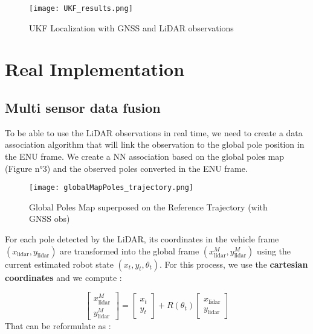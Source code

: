 \documentclass[conference]{IEEEtran}
\begin{document}
\begin{figure}[H]
    \centering
    \texttt{[image: UKF\_results.png]}
    \caption{UKF Localization with GNSS and LiDAR observations}
    \label{fig:enter-label}
\end{figure}

\vspace{3mm}

\section{Real Implementation}

\vspace{2mm}

\subsection{Multi sensor data fusion}

To be able to use the LiDAR observations in real time, we need to create a data association algorithm that will link the observation to the global pole position in the ENU frame. We create a NN association based on the global poles map (Figure n°3) and the observed poles converted in the ENU frame.   

\begin{figure}[H]
    \centering
    \texttt{[image: globalMapPoles\_trajectory.png]}
    \caption{Global Poles Map superposed on the Reference Trajectory (with GNSS obs)}
    \label{fig:enter-label}
\end{figure}

For each pole detected by the LiDAR, its coordinates in the vehicle frame \((x_{\text{lidar}}, y_{\text{lidar}})\) are transformed into the global frame \((x_{\text{lidar}}^{M}, y_{\text{lidar}}^{M})\) using the current estimated robot state \((x_t, y_t, \theta_t)\). For this process, we use the \textbf{cartesian coordinates} and we compute :

\[
\begin{bmatrix}
x_{\text{lidar}}^{M} \\
y_{\text{lidar}}^{M}
\end{bmatrix}
=
\begin{bmatrix}
x_t \\
y_t
\end{bmatrix} 
+
R(\theta_t)
\begin{bmatrix}
x_{\text{lidar}} \\
y_{\text{lidar}}
\end{bmatrix}
\]
\noindent That can be reformulate as :
\end{document}

